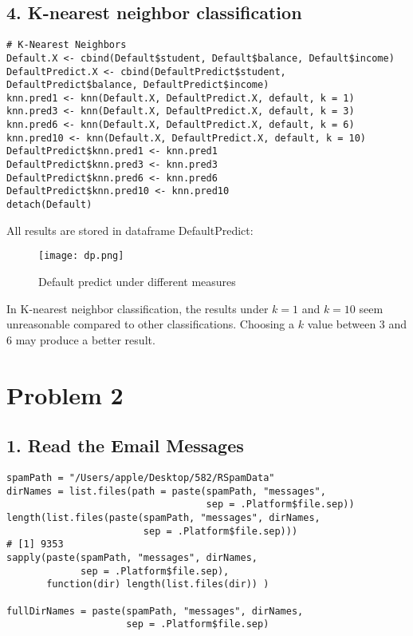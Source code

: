 \documentclass{article}
\begin{document}
\subsection*{4. K-nearest neighbor classification}
\begin{verbatim}
# K-Nearest Neighbors
Default.X <- cbind(Default$student, Default$balance, Default$income)
DefaultPredict.X <- cbind(DefaultPredict$student, DefaultPredict$balance, DefaultPredict$income)
knn.pred1 <- knn(Default.X, DefaultPredict.X, default, k = 1)
knn.pred3 <- knn(Default.X, DefaultPredict.X, default, k = 3)
knn.pred6 <- knn(Default.X, DefaultPredict.X, default, k = 6)
knn.pred10 <- knn(Default.X, DefaultPredict.X, default, k = 10)
DefaultPredict$knn.pred1 <- knn.pred1
DefaultPredict$knn.pred3 <- knn.pred3
DefaultPredict$knn.pred6 <- knn.pred6
DefaultPredict$knn.pred10 <- knn.pred10
detach(Default)
\end{verbatim}
\newpage
All results are stored in dataframe DefaultPredict:
\begin{figure}[H] 
\begin{center} 
\texttt{[image: dp.png]}  
\caption{Default predict under different measures} 
\end{center} 
\end{figure}
In K-nearest neighbor classification, the results under $k=1$ and $k=10$ seem unreasonable compared to other classifications. Choosing a $k$ value between 3 and 6 may produce a better result.

\section*{Problem 2}
\subsection*{1. Read the Email Messages}
\begin{verbatim}
spamPath = "/Users/apple/Desktop/582/RSpamData"
dirNames = list.files(path = paste(spamPath, "messages", 
                                   sep = .Platform$file.sep))
length(list.files(paste(spamPath, "messages", dirNames, 
                        sep = .Platform$file.sep)))
# [1] 9353
sapply(paste(spamPath, "messages", dirNames, 
             sep = .Platform$file.sep), 
       function(dir) length(list.files(dir)) )

fullDirNames = paste(spamPath, "messages", dirNames, 
                     sep = .Platform$file.sep)
\end{verbatim}
\end{document}

